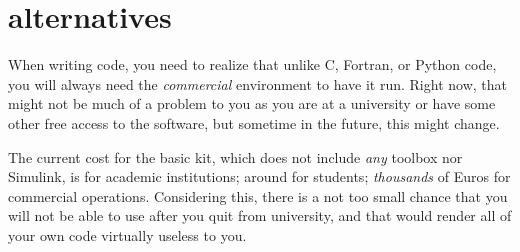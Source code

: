 %
% 
% 
% 
%
\newpage
\section*{\matlab{} alternatives}

When writing \matlab{} code, you need to realize that unlike C, Fortran, or Python code, you will always need the \emph{commercial} \matlab{} environment to have it run. Right now, that might not be much of a problem to you as you are at a university or have some other free access to the software, but sometime in the future, this might change.

The current cost for the basic \matlab{} kit, which does not include \emph{any} toolbox nor Simulink, is  for academic institutions; around  for students; \emph{thousands} of Euros for commercial operations. Considering this, there is a not too small chance that you will not be able to use \matlab{} after you quit from university, and that would render all of your own code virtually useless to you.

